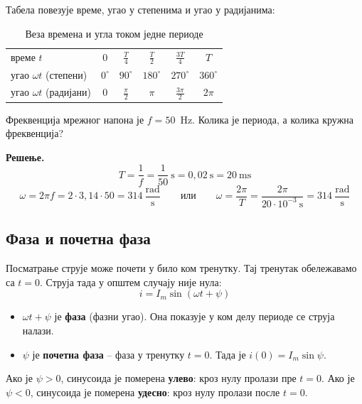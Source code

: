 \documentclass{article}
\begin{document}
Табела повезује време, угао у степенима и угао у радијанима:
\begin{table}[H]
    \centering
    \begin{tabular}{l|ccccc}
        \toprule
        време $t$                        & $0$ & $\frac{T}{4}$   & $\frac{T}{2}$ & $\frac{3T}{4}$   & $T$ \\
        угао $\omega t$ (степени)        & $0^\circ$ & $90^\circ$ & $180^\circ$ & $270^\circ$ & $360^\circ$ \\
        угао $\omega t$ (радијани)       & $0$ & $\frac{\pi}{2}$ & $\pi$         & $\frac{3\pi}{2}$ & $2\pi$ \\
        \bottomrule
    \end{tabular}
    \caption{Веза времена и угла током једне периоде}
    \label{tab:ugao}
\end{table}

\begin{primer}
Фреквенција мрежног напона је $f = 50$~Hz. Колика је периода, а колика кружна фреквенција?

\textbf{Решење.}
\[
    T = \frac{1}{f} = \frac{1}{50}~\mathrm{s} = 0{,}02~\mathrm{s} = 20~\mathrm{ms}
\]
\[
    \omega = 2\pi f = 2\cdot 3{,}14\cdot 50 = 314~\frac{\mathrm{rad}}{\mathrm{s}}
    \qquad\text{или}\qquad
    \omega = \frac{2\pi}{T} = \frac{2\pi}{20\cdot 10^{-3}~\mathrm{s}} = 314~\frac{\mathrm{rad}}{\mathrm{s}}
\]
\end{primer}

\subsection{Фаза и почетна фаза}

Посматрање струје може почети у било ком тренутку. Тај тренутак обележавамо са $t = 0$. Струја тада у општем случају није нула:
\begin{equation}
    i = I_m\sin(\omega t + \psi)
\end{equation}
\begin{itemize}
    \item $\omega t + \psi$ је \textbf{фаза} (фазни угао). Она показује у ком делу периоде се струја налази.
    \item $\psi$ је \textbf{почетна фаза} -- фаза у тренутку $t = 0$. Тада је $i(0) = I_m\sin\psi$.
\end{itemize}
Ако је $\psi > 0$, синусоида је померена \textbf{улево}: кроз нулу пролази пре $t = 0$.
Ако је $\psi < 0$, синусоида је померена \textbf{удесно}: кроз нулу пролази после $t = 0$.
\end{document}
